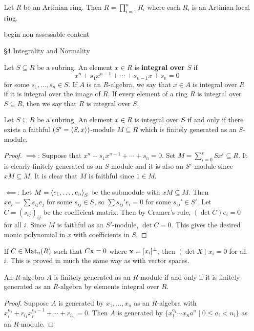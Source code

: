 \begin{thm}[3.37]
  Let $R$ be an Artinian ring.
  Then $R = \prod_{i=1}^n R_i$ where each $R_i$ is an Artinian local ring.  \end{thm}

begin non-assessable content

\S4 Integrality and Normality

\begin{defn}[4.1]
  Let $S \subseteq R$ be a subring.
  An element $x \in R$ is \textbf{integral over $S$} if
  \[ x^n + s_1x^{n-1} + \cdots + s_{n-1}x + s_n = 0 \]
  for some $s_1,\ldots,s_n \in S$.
  If $A$ is an $R$-algebra, we say that $x \in A$ is integral over $R$ if it is integral over the image of $R$.
  If every element of a ring $R$ is integral over $S \subseteq R$, then we say that $R$ is integral over $S$.
\end{defn}

\begin{prop}[4.2]
  Let $S \subseteq R$ be a subring.
  An element $x \in R$ is integral over $S$ if and only if there exists a faithful $(S'={\left\langle S,x \right\rangle})$-module $M \subseteq R$ which is finitely generated as an $S$-module.
\end{prop}

\begin{proof}
  $\implies$:
  Suppose that $x^n+s_1x^{n-1}+\cdots+s_n=0$.
  Set $M=\sum_{i=0}^nSx^i \subseteq R$.
  It is clearly finitely generated as an $S$-module and it is also an $S'$-module since $xM \subseteq M$.
  It is clear that $M$ is faithful since $1 \in M$.

  $\impliedby$:
  Let $M={\left\langle e_1,\ldots,e_n \right\rangle}_S$ be the submodule with $xM \subseteq M$.
  Then $xe_i = \sum s_{ij} e_j$ for some $s_{ij} \in S$, so $\sum s_{ij}'e_i=0$ for some $s_{ij}' \in S'$.
  Let $C=(s_{ij})_{ij}$ be the coefficient matrix.
  Then by Cramer's rule, $(\det C)e_i=0$ for all $i$.
  Since $M$ is faithful as an $S'$-module, $\det C=0$.
  This gives the desired monic polynomial in $x$ with coefficients in $S$.
\end{proof}

\begin{rmk}
  If $C \in \operatorname{Mat}_n(R)$ such that $C \mathbf{x} = 0$ where $\mathbf{x} = [x_i]^\perp$, then $(\det X)x_i=0$ for all $i$.
  This is proved in much the same way as with vector spaces.
\end{rmk}

\begin{prop}[4.3]
  An $R$-algebra $A$ is finitely generated as an $R$-module if and only if it is finitely-generated as an $R$-algebra by elements integral over $R$.
\end{prop}

\begin{proof}
  Suppose $A$ is generated by $x_1,\ldots,x_n$ as an $R$-algebra with $x_i^{n_i}+r_{i_1}x_i^{n_i-1}+\cdots+r_{i_{n_i}}=0$.
  Then $A$ is generated by $\{ x_1^{a_1} \cdots x_na^n \mid 0 \leq a_i < n_i \}$ as an $R$-module.
\end{proof}
